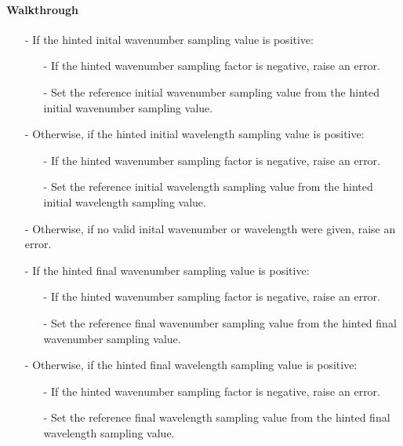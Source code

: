 \documentclass[letterpaper,12pt]{article}
\begin{document}
\paragraph{Walkthrough}
\begin{enumerate}[leftmargin=10pt, noitemsep, parsep=0pt, topsep=0ex]
\item[-] If the hinted inital wavenumber sampling value is positive:
\begin{enumerate}[leftmargin=10pt, noitemsep, parsep=0pt, topsep=0ex]
\item[-] If the hinted wavenumber sampling factor is negative, raise an error.
\item[-] Set the reference initial wavenumber sampling value from the hinted initial wavenumber sampling value.
\end{enumerate}
\item[-] Otherwise, if the hinted initial wavelength sampling value is positive:
\begin{enumerate}[leftmargin=10pt, noitemsep, parsep=0pt, topsep=0ex]
\item[-] If the hinted wavenumber sampling factor is negative, raise an error.
\item[-] Set the reference initial wavelength sampling value from the hinted initial wavelength sampling value.
\end{enumerate}
\item[-] Otherwise, if no valid inital wavenumber or wavelength were given, raise an error.
\item[-] If the hinted final wavenumber sampling value is positive:
\begin{enumerate}[leftmargin=10pt, noitemsep, parsep=0pt, topsep=0ex]
\item[-] If the hinted wavenumber sampling factor is negative, raise an error.
\item[-] Set the reference final wavenumber sampling value from the hinted final wavenumber sampling value.
\end{enumerate}
\item[-] Otherwise, if the hinted final wavelength sampling value is positive:
\begin{enumerate}[leftmargin=10pt, noitemsep, parsep=0pt, topsep=0ex]
\item[-] If the hinted wavenumber sampling factor is negative, raise an error.
\item[-] Set the reference final wavelength sampling value from the hinted final wavelength sampling value.
\end{enumerate}

\end{enumerate}
\end{document}
